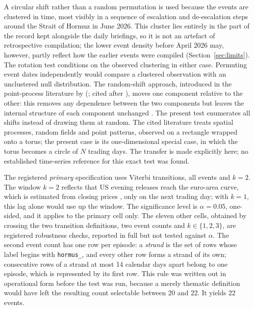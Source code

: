 \documentclass[11pt,a4paper]{article}
\begin{document}
A circular shift rather than a random permutation is used because the events are clustered in time, most visibly in a sequence of escalation and de-escalation steps around the Strait of Hormuz in June 2026. This cluster lies entirely in the part of the record kept alongside the daily briefings, so it is not an artefact of retrospective compilation; the lower event density before April 2026 may, however, partly reflect how the earlier events were compiled (Section~\ref{sec:limits}). The rotation test conditions on the observed clustering in either case. Permuting event dates independently would compare a clustered observation with an unclustered null distribution. The random-shift approach, introduced in the point-process literature by \citeauthor{lotwick1982} (\citeyear{lotwick1982}; cited after \citealt{mrkvicka2020}), moves one component relative to the other: this removes any dependence between the two components but leaves the internal structure of each component unchanged \citep[Sec.~1]{mrkvicka2020}. The present test enumerates all shifts instead of drawing them at random. The cited literature treats spatial processes, random fields and point patterns, observed on a rectangle wrapped onto a torus; the present case is its one-dimensional special case, in which the torus becomes a circle of $N$ trading days. The transfer is made explicitly here; no established time-series reference for this exact test was found.

The registered \emph{primary} specification uses Viterbi transitions, all \NEvents{} events and $k=2$. The window $k=2$ reflects that US evening releases reach the euro-area curve, which is estimated from closing prices \citep[p.~3]{ecb_ycmethod}, only on the next trading day; with $k=1$, this lag alone would use up the window. The significance level is $\alpha=0.05$, one-sided, and it applies to the primary cell only. The eleven other cells, obtained by crossing the two transition definitions, two event counts and $k\in\{1,2,3\}$, are registered robustness checks, reported in full but not tested against $\alpha$. The second event count has one row per episode: a \emph{strand} is the set of rows whose label begins with \texttt{hormus\_}, and every other row forms a strand of its own; consecutive rows of a strand at most 14 calendar days apart belong to one episode, which is represented by its first row. This rule was written out in operational form before the test was run, because a merely thematic definition would have left the resulting count selectable between 20 and 22. It yields 22 events.
\end{document}
